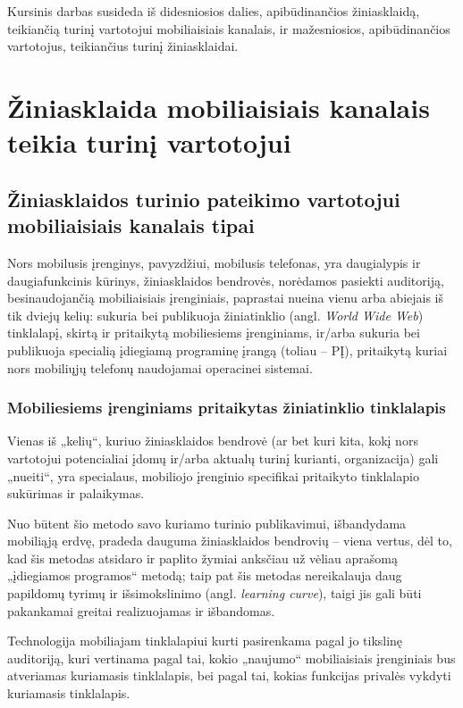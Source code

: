 \documentclass[kursinis-darbas]{vukf}
\begin{document}
Kursinis darbas susideda iš didesniosios dalies, apibūdinančios žiniasklaidą, teikiančią turinį vartotojui mobiliaisiais kanalais, ir mažesniosios, apibūdinančios vartotojus, teikiančius turinį žiniasklaidai.


\section{Žiniasklaida mobiliaisiais kanalais teikia turinį vartotojui}

\subsection{Žiniasklaidos turinio pateikimo vartotojui mobiliaisiais kanalais tipai}

Nors mobilusis įrenginys, pavyzdžiui, mobilusis telefonas, yra daugialypis ir daugiafunkcinis kūrinys, žiniasklaidos bendrovės, norėdamos pasiekti auditoriją, besinaudojančią mobiliaisiais įrenginiais, paprastai nueina vienu arba abiejais iš tik dviejų kelių: sukuria bei publikuoja žiniatinklio (angl. \emph{World Wide Web}) tinklalapį, skirtą ir pritaikytą mobiliesiems įrenginiams, ir/arba sukuria bei publikuoja specialią įdiegiamą programinę įrangą (toliau – PĮ), pritaikytą kuriai nors mobiliųjų telefonų naudojamai operacinei sistemai.

\subsubsection{Mobiliesiems įrenginiams pritaikytas žiniatinklio tinklalapis}

Vienas iš „kelių“, kuriuo žiniasklaidos bendrovė (ar bet kuri kita, kokį nors vartotojui potencialiai įdomų ir/arba aktualų turinį kurianti, organizacija) gali „nueiti“, yra specialaus, mobiliojo įrenginio specifikai pritaikyto tinklalapio sukūrimas ir palaikymas.

Nuo būtent šio metodo savo kuriamo turinio publikavimui, išbandydama mobiliąją erdvę, pradeda dauguma žiniasklaidos bendrovių – viena vertus, dėl to, kad šis metodas atsidaro ir paplito žymiai anksčiau už vėliau aprašomą „įdiegiamos programos“ metodą; taip pat šis metodas nereikalauja daug papildomų tyrimų ir išsimokslinimo (angl. \emph{learning curve}), taigi jis gali būti pakankamai greitai realizuojamas ir išbandomas.

Technologija mobiliajam tinklalapiui kurti pasirenkama pagal jo tikslinę auditoriją, kuri vertinama pagal tai, kokio „naujumo“ mobiliaisiais įrenginiais bus atveriamas kuriamasis tinklalapis, bei pagal tai, kokias funkcijas privalės vykdyti kuriamasis tinklalapis.
\end{document}
